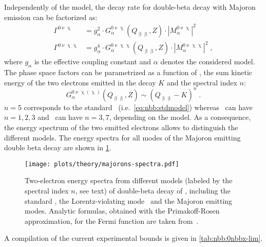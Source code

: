 Independently of the model, the decay rate for double-beta decay with Majoron emission can
be factorized as:
\begin{align*}
  \Gamma^{0\upnu\upchi}  &= g_\alpha^2 \cdot G_\alpha^{0\upnu\upchi}(Q_{\upbeta\upbeta}, Z)
    \cdot |M_\alpha^{0\upnu\upchi}|^2 \\
  \Gamma^{0\upnu\upchi\upchi} &= g_\alpha^4 \cdot G_\alpha^{0\upnu\upchi\upchi}(Q_{\upbeta\upbeta}, Z)
    \cdot |M_\alpha^{0\upnu\upchi\upchi}|^2 \;,
\end{align*}
where $g_\alpha$ is the effective coupling constant and $\alpha$ denotes the considered
model. The phase space factors can be parametrized as a function of \qbb, the sum kinetic
energy of the two electrons emitted in the decay $K$ and the spectral index $n$:
\[
  G_\alpha^{0\upnu\upchi(\upchi)}(Q_{\upbeta\upbeta}, Z)
    \sim {(Q_{\upbeta\upbeta} - K)}^n \;.
\]
$n = 5$ corresponds to the standard \nnbb\ (i.e.~\cref{eq:nbb:stdmodel}) whereas \onbbx\
can have $n = 1, 2, 3$ and \onbbxx\ can have $n = 3, 7$, depending on the model. As a
consequence, the energy spectrum of the two emitted electrons allows to distinguish the
different models. The energy spectra for all modes of the Majoron emitting double beta
decay are shown in \cref{fig:nbb:majorons-spectra}.

\begin{table}
  \centering
  \caption{%
    Compilation of up-to-date calculations of phase-space factors
    \psfmajo~\cite{Kotila2015} and nuclear matrix elements \nmemajo\ for various
    Majoron-emitting \onbb\ modes and isotopes.
  }\label{tab:nbb:0nbbx-psf-nme}
  
\end{table}

\begin{figure}
  \centering
  \texttt{[image: plots/theory/majorons-spectra.pdf]}
  \caption{%
    Two-electron energy spectra from different models (labeled by the spectral index $n$,
    see text) of double-beta decay of \gesix, including the standard \nnbb, the
    Lorentz-violating mode \nnbblv\ and the Majoron emitting modes.  Analytic formulas,
    obtained with the Primakoff-Rosen approximation, for the Fermi function are taken
    from~\cite{Tretyak1995, Tretyak2002}.
  }\label{fig:nbb:majorons-spectra}
\end{figure}

 A compilation of the current experimental bounds is given in
\cref{tab:nbb:0nbbx-lim}.

